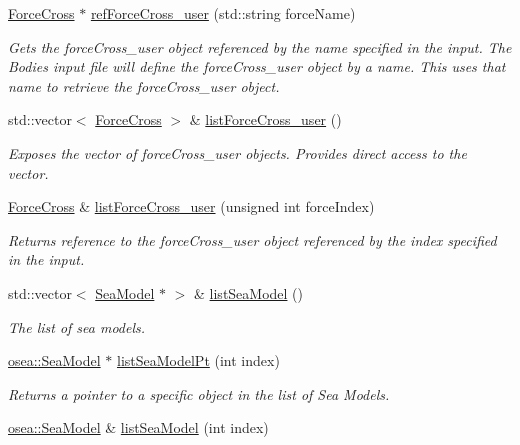 \begin{DoxyCompactItemize}
\hyperlink{classosea_1_1ofreq_1_1_force_cross}{Force\-Cross} $\ast$ \hyperlink{classosea_1_1ofreq_1_1_system_a22c14580904007e564bfba6ab0d052c4}{ref\-Force\-Cross\-\_\-user} (std\-::string force\-Name)
\begin{DoxyCompactList}\small\item\em Gets the force\-Cross\-\_\-user object referenced by the name specified in the input. The Bodies input file will define the force\-Cross\-\_\-user object by a name. This uses that name to retrieve the force\-Cross\-\_\-user object. \end{DoxyCompactList}\item 
std\-::vector$<$ \hyperlink{classosea_1_1ofreq_1_1_force_cross}{Force\-Cross} $>$ \& \hyperlink{classosea_1_1ofreq_1_1_system_aae7cb5596f9d3a44f0bc6fe58b58410a}{list\-Force\-Cross\-\_\-user} ()
\begin{DoxyCompactList}\small\item\em Exposes the vector of force\-Cross\-\_\-user objects. Provides direct access to the vector. \end{DoxyCompactList}\item 
\hyperlink{classosea_1_1ofreq_1_1_force_cross}{Force\-Cross} \& \hyperlink{classosea_1_1ofreq_1_1_system_adcde247d6fe68ee68a65f1a5f2dc8e13}{list\-Force\-Cross\-\_\-user} (unsigned int force\-Index)
\begin{DoxyCompactList}\small\item\em Returns reference to the force\-Cross\-\_\-user object referenced by the index specified in the input. \end{DoxyCompactList}\item 
std\-::vector$<$ \hyperlink{classosea_1_1_sea_model}{Sea\-Model} $\ast$ $>$ \& \hyperlink{classosea_1_1ofreq_1_1_system_a3ae6a8a84f6635bacd1a8c811cd709c6}{list\-Sea\-Model} ()
\begin{DoxyCompactList}\small\item\em The list of sea models. \end{DoxyCompactList}\item 
\hyperlink{classosea_1_1_sea_model}{osea\-::\-Sea\-Model} $\ast$ \hyperlink{classosea_1_1ofreq_1_1_system_ad29994c5b256abcae06eec70da100086}{list\-Sea\-Model\-Pt} (int index)
\begin{DoxyCompactList}\small\item\em Returns a pointer to a specific object in the list of Sea Models. \end{DoxyCompactList}\item 
\hyperlink{classosea_1_1_sea_model}{osea\-::\-Sea\-Model} \& \hyperlink{classosea_1_1ofreq_1_1_system_a7d1d8292a2de26fd7f741e8370da0507}{list\-Sea\-Model} (int index)

\end{DoxyCompactItemize}
